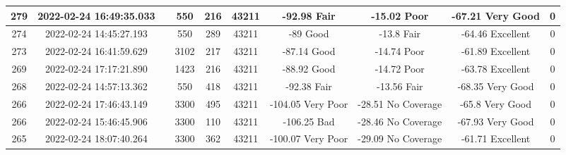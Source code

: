 \begin{longtable*}{|c|c|c|c|c|c|c|c|c|c|}
279&2022-02-24 16:49:35.033&&550&216&43211& -92.98    Fair        & -15.02    Poor        & -67.21    Very Good   & 0\\\hline
{}274&2022-02-24 14:45:27.193&&550&289&43211& -89       Good        & -13.8     Fair        & -64.46    Excellent   & 0\\\hline
{}273&2022-02-24 16:41:59.629&&3102&217&43211& -87.14    Good        & -14.74    Poor        & -61.89    Excellent   & 0\\\hline
{}269&2022-02-24 17:17:21.890&&1423&216&43211& -88.92    Good        & -14.72    Poor        & -63.78    Excellent   & 0\\\hline
{}268&2022-02-24 14:57:13.362&&550&418&43211& -92.38    Fair        & -13.56    Fair        & -68.35    Very Good   & 0\\\hline
{}266&2022-02-24 17:46:43.149&&3300&495&43211& -104.05   Very Poor   & -28.51    No Coverage & -65.8     Very Good   & 0\\\hline
{}266&2022-02-24 15:46:45.906&&3300&110&43211& -106.25   Bad         & -28.46    No Coverage & -67.93    Very Good   & 0\\\hline
{}265&2022-02-24 18:07:40.264&&3300&362&43211& -100.07   Very Poor   & -29.09    No Coverage & -61.71    Excellent   & 0\\\hline

\end{longtable*}
